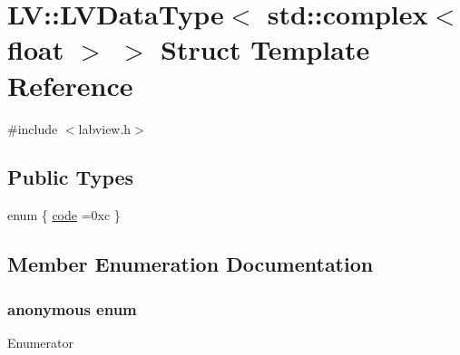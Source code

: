 \hypertarget{struct_l_v_1_1_l_v_data_type_3_01std_1_1complex_3_01float_01_4_01_4}{}\section{LV\+:\+:L\+V\+Data\+Type$<$ std\+:\+:complex$<$ float $>$ $>$ Struct Template Reference}
\label{struct_l_v_1_1_l_v_data_type_3_01std_1_1complex_3_01float_01_4_01_4}


{\ttfamily \#include $<$labview.\+h$>$}

\subsection*{Public Types}
\begin{DoxyCompactItemize}
\item 
enum \{ \hyperlink{struct_l_v_1_1_l_v_data_type_3_01std_1_1complex_3_01float_01_4_01_4_aca703b4c0c2e2a3d7105157ae24315e5ad74606b0c541f8577e62dce2598b298a}{code} =0xc
 \}
\end{DoxyCompactItemize}


\subsection{Member Enumeration Documentation}
\subsubsection[{\texorpdfstring{anonymous enum}{anonymous enum}}]{\setlength{\rightskip}{0pt plus 5cm}anonymous enum}\hypertarget{struct_l_v_1_1_l_v_data_type_3_01std_1_1complex_3_01float_01_4_01_4_aca703b4c0c2e2a3d7105157ae24315e5}{}\label{struct_l_v_1_1_l_v_data_type_3_01std_1_1complex_3_01float_01_4_01_4_aca703b4c0c2e2a3d7105157ae24315e5}
\begin{Desc}
\item[Enumerator]\par
\begin{description}
\item[{\em 
code\hypertarget{struct_l_v_1_1_l_v_data_type_3_01std_1_1complex_3_01float_01_4_01_4_aca703b4c0c2e2a3d7105157ae24315e5ad74606b0c541f8577e62dce2598b298a}{}\label{struct_l_v_1_1_l_v_data_type_3_01std_1_1complex_3_01float_01_4_01_4_aca703b4c0c2e2a3d7105157ae24315e5ad74606b0c541f8577e62dce2598b298a}
}]\end{description}
\end{Desc}

